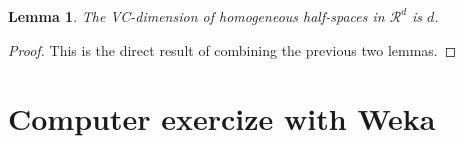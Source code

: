 \documentclass[11pt]{article}
\newtheorem{lemma}{Lemma}[section]
\begin{document}
\begin{lemma}
    The VC-dimension of homogeneous half-spaces in $\mathcal{R}^d$ is $d$.
\end{lemma}
\begin{proof}
    This is the direct result of combining the previous two lemmas.
\end{proof}


\section{Computer exercize with Weka}

%
%

\end{document}
